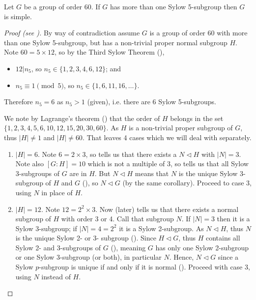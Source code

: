 \begin{theorem}\label{thrm-group-of-order-60-with->1-sylow-5-subgroup-is-simple}
    Let $G$ be a group of order 60. If $G$ has more than one Sylow 5-subgroup then $G$ is simple.
\end{theorem}
\begin{proof}[Proof (see {\cite[Proposition 4.21]{dummit_foote_2004}})]
    By way of contradiction assume $G$ is a group of order 60 with more than one Sylow 5-subgroup, but has a non-trivial proper normal subgroup $H$. Note $60 = 5 \times 12$, so by the Third Sylow Theorem (),
    \begin{itemize}
        \item $12 \vert n_5$, so $n_5 \in \{1, 2, 3, 4, 6, 12\}$; and
        \item $n_5 \equiv 1 \pmod 5$, so $n_5 \in \{1, 6, 11, 16, \dots\}$.
    \end{itemize}
    Therefore $n_5 = 6$ as $n_5 > 1$ (given), i.e. there are 6 Sylow 5-subgroups.

    We note by Lagrange's theorem () that the order of $H$ belongs in the set $\{1, 2, 3, 4, 5, 6, 10, 12, 15, 20, 30, 60\}$. As $H$ is a non-trivial proper subgroup of $G$, thus $|H| \neq 1$ and $|H| \neq 60$. That leaves 4 cases which we will deal with separately.
    \begin{enumerate}
        \item $|H| = 6$. Note $6 = 2 \times 3$, so  tells us that there exists a $N \lhd H$ with $|N| = 3$. Note also $[G:H] = 10$ which is not a multiple of 3, so  tells us that all Sylow 3-subgroups of $G$ are in $H$. But $N \lhd H$ means that $N$ is the unique Sylow 3-subgroup of $H$ and $G$ (), so $N \lhd G$ (by the same corollary). Proceed to case 3, using $N$ in place of $H$.

        \item $|H| = 12$. Note $12 = 2^2 \times 3$. Now  (later) tells us that there exists a normal subgroup of $H$ with order 3 or 4. Call that subgroup $N$. If $|N| = 3$ then it is a Sylow 3-subgroup; if $|N| = 4 = 2^2$ it is a Sylow 2-subgroup. As $N \lhd H$, thus $N$ is the unique Sylow 2- or 3- subgroup (). Since $H \lhd G$, thus $H$ contains all Sylow 2- and 3-subgroups of $G$ (), meaning $G$ has only one Sylow 2-subgroup or one Sylow 3-subgroup (or both), in particular $N$. Hence, $N \lhd G$ since a Sylow $p$-subgroup is unique if and only if it is normal (). Proceed with case 3, using $N$ instead of $H$.


\end{enumerate}
\end{proof}
